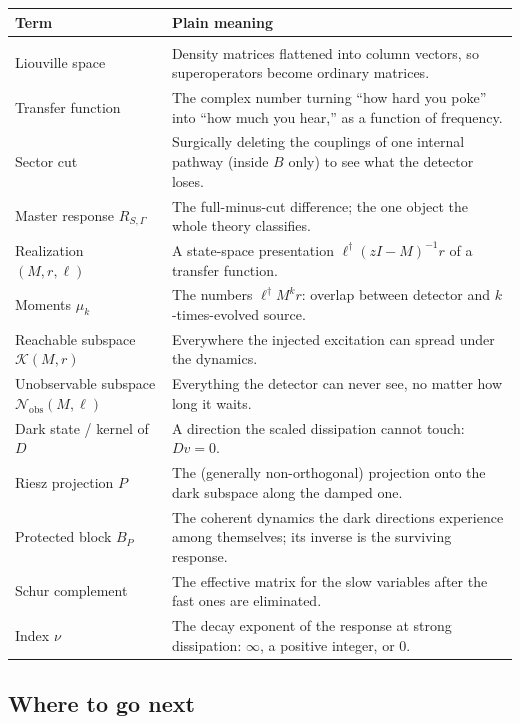 \documentclass[11pt]{article}
\newcommand{\kry}{\mathcal K}
\newcommand{\nobs}{\mathcal N_{\mathrm{obs}}}
\begin{document}
\begin{center}
\begin{tabular}{p{}p{}}
\textbf{Term} & \textbf{Plain meaning}\\[3pt]
\hline\\[-8pt]
Liouville space & Density matrices flattened into column vectors, so
superoperators become ordinary matrices.\\[3pt]
Transfer function & The complex number turning ``how hard you poke'' into
``how much you hear,'' as a function of frequency.\\[3pt]
Sector cut & Surgically deleting the couplings of one internal pathway
(inside $B$ only) to see what the detector loses.\\[3pt]
Master response $R_{S,\Gamma}$ & The full-minus-cut difference; the one
object the whole theory classifies.\\[3pt]
Realization $(M,r,\ell)$ & A state-space presentation
$\ell^\dagger(zI-M)^{-1}r$ of a transfer function.\\[3pt]
Moments $\mu_k$ & The numbers $\ell^\dagger M^k r$: overlap between
detector and $k$-times-evolved source.\\[3pt]
Reachable subspace $\kry(M,r)$ & Everywhere the injected excitation can
spread under the dynamics.\\[3pt]
Unobservable subspace\newline $\nobs(M,\ell)$ & Everything the detector can
never see, no matter how long it waits.\\[3pt]
Dark state / kernel of $D$ & A direction the scaled dissipation cannot
touch: $Dv=0$.\\[3pt]
Riesz projection $P$ & The (generally non-orthogonal) projection onto the
dark subspace along the damped one.\\[3pt]
Protected block $B_P$ & The coherent dynamics the dark directions
experience among themselves; its inverse is the surviving response.\\[3pt]
Schur complement & The effective matrix for the slow variables after the
fast ones are eliminated.\\[3pt]
Index $\nu$ & The decay exponent of the response at strong dissipation:
$\infty$, a positive integer, or $0$.\\[3pt]
\hline
\end{tabular}
\end{center}

\subsection{Where to go next}
\end{document}

